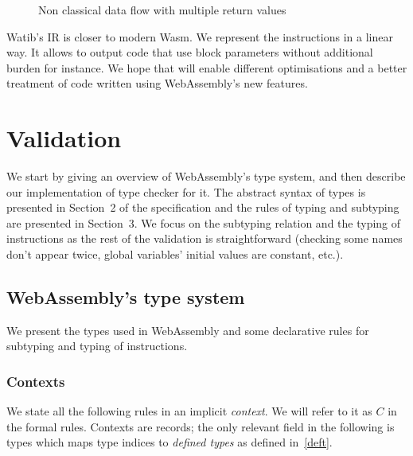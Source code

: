 \documentclass[a4paper,11pt]{article}
\begin{document}
\begin{figure}[h]
  \centering
  \caption{Non classical data flow with multiple return values}\label{data-flow}
\end{figure}

\textsf{Watib}'s IR is closer to modern Wasm. We represent the instructions in a
linear way. It allows to output code that use block parameters without
additional burden for instance. We hope that will enable different optimisations
and a better treatment of code written using WebAssembly's new features.

\section{Validation}\label{val}
We start by giving an overview of WebAssembly's type system, and then describe
our implementation of type checker for it. The abstract syntax of types is
presented in Section~2 of the specification and the rules of typing and
subtyping are presented in Section~3. We focus on the subtyping relation and the
typing of instructions as the rest of the validation is straightforward
(checking some names don't appear twice, global variables' initial values are
constant, etc.).
\subsection{WebAssembly's type system}
We present the types used in WebAssembly and some declarative rules for
subtyping and typing of instructions.
\subsubsection{Contexts}
We state all the following rules in an implicit \emph{context}. We will refer to
it as $C$ in the formal rules. Contexts are records; the only relevant field in
the following is \textsf{types} which maps type indices to \emph{defined types}
as defined in~\ref{deft}.
\end{document}
